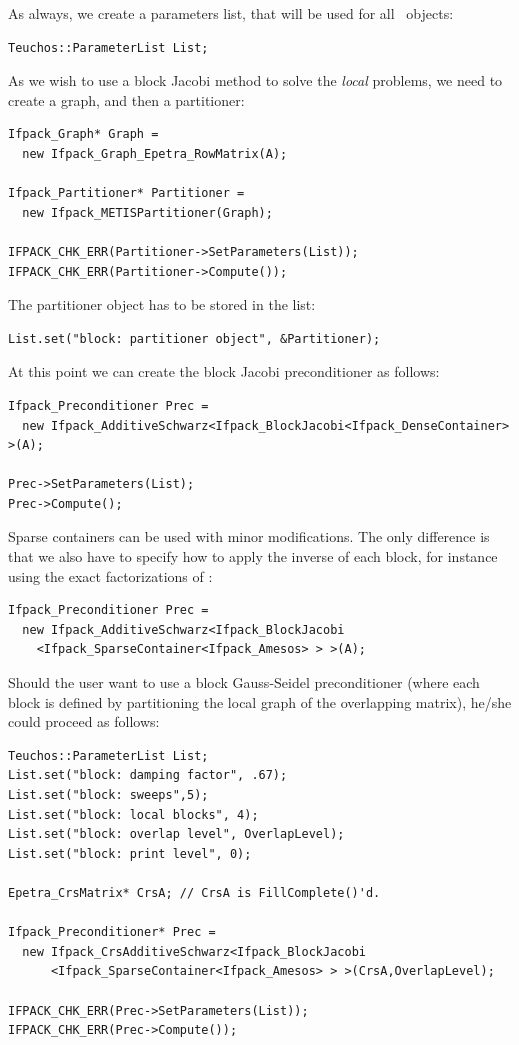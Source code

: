 As always, we create a parameters list, that will be used
for all \ifpack\ objects:
\begin{verbatim}
Teuchos::ParameterList List;
\end{verbatim}
As we wish to use a block Jacobi method to solve the {\sl local} problems, we
need to create a graph, and then a partitioner:
\begin{verbatim}
Ifpack_Graph* Graph = 
  new Ifpack_Graph_Epetra_RowMatrix(A);

Ifpack_Partitioner* Partitioner = 
  new Ifpack_METISPartitioner(Graph);

IFPACK_CHK_ERR(Partitioner->SetParameters(List));
IFPACK_CHK_ERR(Partitioner->Compute());
\end{verbatim}
The partitioner object has to be stored in the list:
\begin{verbatim}
List.set("block: partitioner object", &Partitioner);
\end{verbatim}
At this point we can create the block Jacobi preconditioner as follows:
\begin{verbatim}
Ifpack_Preconditioner Prec = 
  new Ifpack_AdditiveSchwarz<Ifpack_BlockJacobi<Ifpack_DenseContainer> >(A);

Prec->SetParameters(List);
Prec->Compute();
\end{verbatim}

Sparse containers can be used with minor modifications. The only difference is
that we also have to specify how to apply the inverse of each block, for
instance using the exact factorizations of \amesos:
\begin{verbatim}
Ifpack_Preconditioner Prec = 
  new Ifpack_AdditiveSchwarz<Ifpack_BlockJacobi
    <Ifpack_SparseContainer<Ifpack_Amesos> > >(A);
\end{verbatim}



Should the user want to use a block Gauss-Seidel preconditioner (where each
block is defined by partitioning the local graph of the overlapping matrix),
he/she could proceed as follows:
\begin{verbatim}
Teuchos::ParameterList List;
List.set("block: damping factor", .67);
List.set("block: sweeps",5);
List.set("block: local blocks", 4);
List.set("block: overlap level", OverlapLevel);
List.set("block: print level", 0);

Epetra_CrsMatrix* CrsA; // CrsA is FillComplete()'d.

Ifpack_Preconditioner* Prec =
  new Ifpack_CrsAdditiveSchwarz<Ifpack_BlockJacobi
      <Ifpack_SparseContainer<Ifpack_Amesos> > >(CrsA,OverlapLevel);

IFPACK_CHK_ERR(Prec->SetParameters(List));
IFPACK_CHK_ERR(Prec->Compute());
\end{verbatim}

